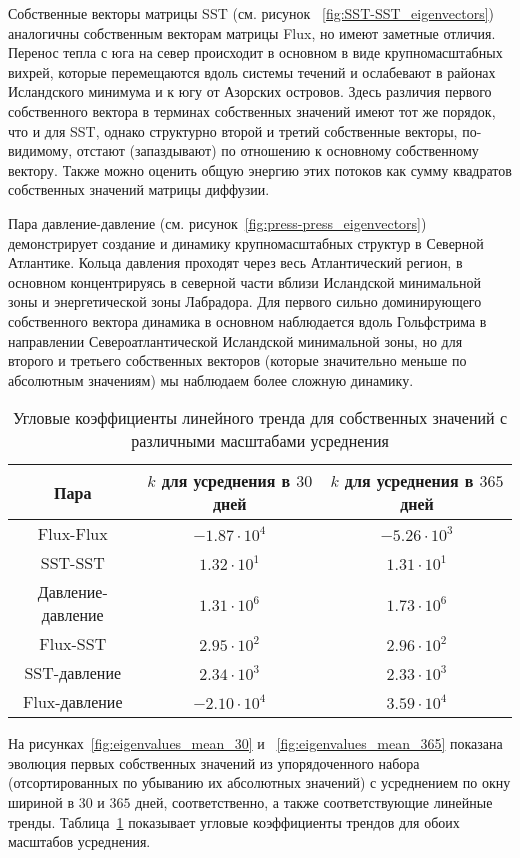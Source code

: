 Собственные векторы матрицы SST (см. рисунок ~\ref{fig:SST-SST_eigenvectors}) аналогичны собственным векторам матрицы Flux, но имеют заметные отличия. Перенос тепла с юга на север происходит в основном в виде крупномасштабных вихрей, которые перемещаются вдоль системы течений и ослабевают в районах Исландского минимума и к югу от Азорских островов. Здесь различия первого собственного вектора в терминах собственных значений имеют тот же порядок, что и для SST, однако структурно второй и третий собственные векторы, по-видимому, отстают (запаздывают) по отношению к основному собственному вектору. Также можно оценить общую энергию этих потоков как сумму квадратов собственных значений матрицы диффузии.

Пара давление-давление (см. рисунок~\ref{fig:press-press_eigenvectors}) демонстрирует создание и динамику крупномасштабных структур в Северной Атлантике. Кольца давления проходят через весь Атлантический регион, в основном концентрируясь в северной части вблизи Исландской минимальной зоны и энергетической зоны Лабрадора. Для первого сильно доминирующего собственного вектора динамика в основном наблюдается вдоль Гольфстрима в направлении Североатлантической Исландской минимальной зоны, но для второго и третьего собственных векторов (которые значительно меньше по абсолютным значениям) мы наблюдаем более сложную динамику.

\begin{table}
	\caption{Угловые коэффициенты линейного тренда для собственных значений с различными масштабами усреднения }
	\centering
	\begin{tabular}{|c|c|c|}
		\hline
		Пара & $k$ для усреднения в $30$ дней & $k$ для усреднения в $365$ дней\\
		\hline
		Flux-Flux & $-1.87 \cdot 10^{4}$ & $-5.26 \cdot 10^{3}$ \\
		SST-SST & $1.32 \cdot 10^{1}$ & $1.31 \cdot 10^{1}$ \\
		Давление-давление & $1.31 \cdot 10^{6}$ & $1.73 \cdot 10^{6}$ \\
		Flux-SST & $2.95 \cdot 10^{2}$ & $2.96 \cdot 10^{2}$ \\
		SST-давление & $2.34 \cdot 10^{3}$ & $2.33 \cdot 10^{3}$ \\
		Flux-давление & $-2.10 \cdot 10^{4}$ & $3.59 \cdot 10^{4}$ \\
		\hline
	\end{tabular}
	\label{tab:angular_eigens}
\end{table}

На рисунках~\ref{fig:eigenvalues_mean_30} и ~\ref{fig:eigenvalues_mean_365} показана эволюция первых собственных значений из упорядоченного набора (отсортированных по убыванию их абсолютных значений) с усреднением по окну шириной в $30$ и $365$ дней, соответственно, а также соответствующие линейные тренды. Таблица~\ref{tab:angular_eigens} показывает угловые коэффициенты трендов для обоих масштабов усреднения.


